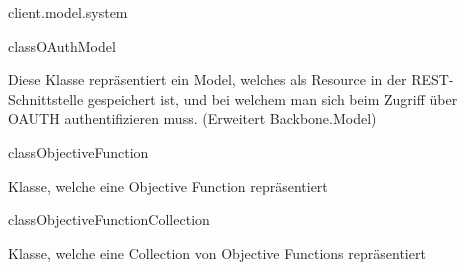 \begin{texdocpackage}{client.model.system}
\begin{texdocclass}{class}{OAuthModel}
\label{texdoclet:edu.kit.informatik.studyplan.client.model.system.OAuthModel}
\begin{texdocclassintro}
Diese Klasse repräsentiert ein Model, welches als Resource in der
 REST-Schnittstelle gespeichert ist, und bei welchem man sich beim Zugriff
 über OAUTH authentifizieren muss. (Erweitert Backbone.Model)\end{texdocclassintro}
\begin{texdocclassfields}
\end{texdocclassfields}
\begin{texdocclassconstructors}
\end{texdocclassconstructors}
\end{texdocclass}


\begin{texdocclass}{class}{ObjectiveFunction}
\label{texdoclet:edu.kit.informatik.studyplan.client.model.system.ObjectiveFunction}
\begin{texdocclassintro}
Klasse, welche eine Objective Function repräsentiert\end{texdocclassintro}
\begin{texdocclassfields}
\end{texdocclassfields}
\begin{texdocclassconstructors}
\end{texdocclassconstructors}
\end{texdocclass}


\begin{texdocclass}{class}{ObjectiveFunctionCollection}
\label{texdoclet:edu.kit.informatik.studyplan.client.model.system.ObjectiveFunctionCollection}
\begin{texdocclassintro}
Klasse, welche eine Collection von Objective Functions repräsentiert\end{texdocclassintro}
\begin{texdocclassfields}
\end{texdocclassfields}
\begin{texdocclassconstructors}
\end{texdocclassconstructors}
\end{texdocclass}



\end{texdocpackage}
